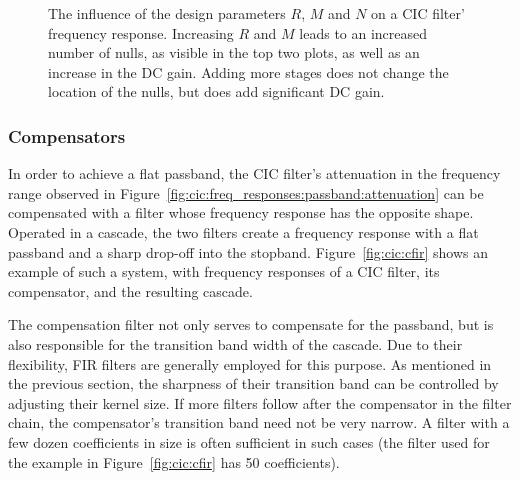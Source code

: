 \begin{figure}
    \centering
        
        \caption[Influence of Design Parameters on Frequency Response]{%
            The influence of  the design parameters $R$, $M$ and  $N$ on a CIC
            filter' frequency  response.  Increasing $R$  and $M$ leads  to an
            increased number  of nulls, as  visible in  the top two  plots, as
            well as an  increase in the DC gain.  Adding  more stages does not
            change  the location  of the  nulls, but  does add  significant DC
            gain.%
        }
        \label{fig:cic:freq_responses:var}
\end{figure}

%
%
\subsubsection{Compensators} %
\label{subsubsec:cic:compensators}

In     order      to     achieve     a     flat      passband,     the     CIC
filter's    attenuation     in    the    frequency    range     observed    in
Figure~\ref{fig:cic:freq_responses:passband:attenuation}  can  be  compensated
with a filter  whose frequency response has the opposite  shape. Operated in a
cascade, the two filters create a  frequency response with a flat passband and
a sharp drop-off into the stopband. Figure~\ref{fig:cic:cfir} shows an example
of such a  system, with frequency responses of a  CIC filter, its compensator,
and the resulting cascade.

The compensation filter not only serves to compensate for the passband, but is
also responsible  for the transition band  width of the cascade. Due  to their
flexibility, FIR filters are generally employed for this purpose. As mentioned
in  the previous  section,  the  sharpness of  their  transition  band can  be
controlled  by  adjusting their  kernel  size. If  more filters  follow  after
the  compensator  in  the  filter chain,  the  compensator's  transition  band
need  not be  very narrow. A  filter  with a  few dozen  coefficients in  size
is  often  sufficient in  such  cases  (the filter  used  for  the example  in
Figure~\ref{fig:cic:cfir} has \num{50} coefficients).

